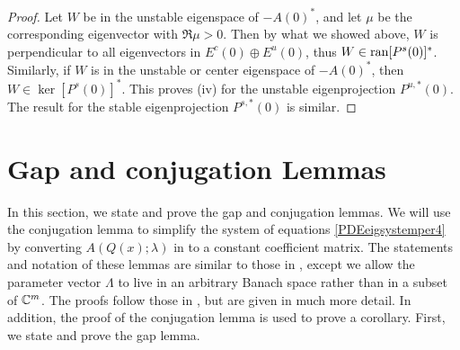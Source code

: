 \documentclass[thesis.tex]{subfiles}
\begin{document}
\begin{lemma}
\begin{proof}
Let $W$ be in the unstable eigenspace of $-A(0)^*$, and let $\mu$ be the corresponding eigenvector with $\Re \mu > 0$. Then by what we showed above, $W$ is perpendicular to all eigenvectors in $E^c(0) \oplus E^u(0)$, thus $W \in \operatorname{ran} [P^s(0)]^*$. Similarly, if $W$ is in the unstable or center eigenspace of $-A(0)^*$, then $W \in \ker [P^s(0)]^*$. This proves (iv) for the unstable eigenprojection $P^{u,*}(0)$. The result for the stable eigenprojection $P^{s,*}(0)$ is similar.
\end{proof}
\end{lemma}

\section{Gap and conjugation Lemmas}

In this section, we state and prove the gap and conjugation lemmas. We will use the conjugation lemma to simplify the system of equations \cref{PDEeigsystemper4} by converting $A(Q(x); \lambda)$ in to a constant coefficient matrix. The statements and notation of these lemmas are similar to those in \cite{Zumbrun2009}, except we allow the parameter vector $\Lambda$ to live in an arbitrary Banach space rather than in a subset of $\mathbb{C}^m$. The proofs follow those in \cite{Zumbrun2009}, but are given in much more detail. In addition, the proof of the conjugation lemma is used to prove a corollary. First, we state and prove the gap lemma.
\end{document}
